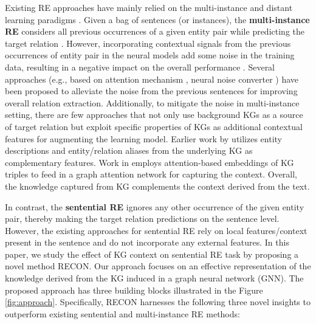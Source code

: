 \documentclass[sigconf]{acmart}
\begin{document}
Existing RE approaches have mainly relied on the 
multi-instance and distant learning paradigms  \cite{smirnova2018relation}.
Given a bag of sentences (or instances), the \textbf{multi-instance RE} considers all previous occurrences of a given entity pair while predicting the target relation \cite{DBLP:conf/emnlp/VashishthJPBT18}. However, incorporating contextual signals from the previous occurrences of entity pair in the neural models add some noise in the training data, resulting in a negative impact on the overall performance \cite{liu2017soft}. Several approaches (e.g., based on attention mechanism \cite{DBLP:conf/naacl/YeL19}, neural noise converter \cite{DBLP:conf/aaai/WuFZ19}) have been proposed to alleviate the noise from the previous sentences for improving overall relation extraction. 
Additionally, to mitigate the noise in multi-instance setting, there are few approaches that not only use background KGs as a source of target relation but exploit specific properties of KGs as additional contextual features for augmenting the learning model.
Earlier work by \cite{DBLP:conf/aaai/Ji0H017,DBLP:conf/emnlp/VashishthJPBT18} utilizes entity descriptions and entity/relation aliases from the underlying KG as complementary features. 
Work in \cite{DBLP:conf/acl/NathaniCSK19} employs attention-based embeddings of KG triples to feed in a graph attention network for capturing the context.
Overall, the knowledge captured from KG complements the context derived from the text.


In contrast, the \textbf{sentential RE} \cite{DBLP:conf/emnlp/SorokinG17} ignores any other occurrence of
the given entity pair, thereby making the target relation predictions on the sentence level. However, the existing approaches for sentential RE \cite{DBLP:conf/emnlp/SorokinG17,DBLP:conf/acl/ZhuLLFCS19} rely on local features/context present in the sentence and do not incorporate any external features. In this paper, we study the effect of KG context on sentential RE task by proposing a novel method RECON. Our approach focuses on an effective representation of the knowledge derived from the KG induced in a graph neural network (GNN). The proposed approach has three building blocks illustrated in the Figure \ref{fig:approach}. Specifically, RECON harnesses the following three novel insights to outperform existing sentential and multi-instance RE methods:
\end{document}
